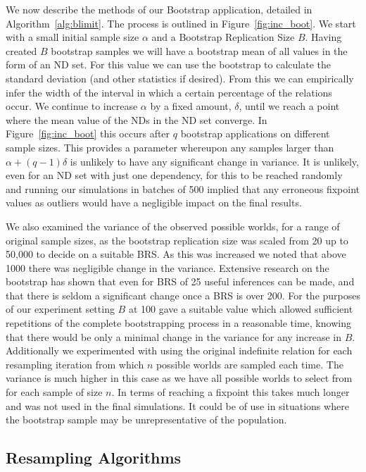 We now describe the methods of our Bootstrap application, detailed in
Algorithm~\ref{alg:blimit}. The process is outlined in
Figure~\ref{fig:inc_boot}.
We start with a small initial sample size $\alpha$ and a 
Bootstrap Replication Size $B$. 
Having created $B$ bootstrap samples we will have a bootstrap
mean of all values in the form of an ND set. For this value
we can use the bootstrap to calculate the standard deviation
(and other statistics if desired). From this we can empirically infer
the width of the interval 
in which a certain percentage of the relations occur. We continue
to increase $\alpha$ by a fixed amount, $\delta$, until we reach 
a point where
the mean value of the NDs in the ND set converge. In
Figure~\ref{fig:inc_boot} this occurs after $q$ bootstrap applications
on different sample sizes. This 
provides a parameter whereupon any samples larger than $\alpha + (q-1)
\delta$ is unlikely to have 
any significant change in variance. It is unlikely, even for an ND set with
just one dependency, for this to be reached randomly and running
our simulations in batches of 500 implied that any erroneous fixpoint
values as outliers would have a negligible impact on the final results.

\medskip

We also examined the variance of the
observed possible worlds, for a range of original sample sizes,
 as the bootstrap replication
size was scaled from 20 up to 50,000 to decide on a suitable BRS. 
As this was increased we noted that
above 1000 there was negligible change in the variance. Extensive research
on the bootstrap has shown that even for BRS of 25 useful inferences
can be made, and that there is seldom a significant change once a BRS
is over 200.
For the purposes
of our experiment setting $B$ at 100 gave a suitable value
which allowed sufficient repetitions of the complete bootstrapping process
in a reasonable time, knowing that there would be only a minimal change
in the variance for any increase in $B$. Additionally we experimented with 
using the original indefinite 
relation for each resampling iteration from which $n$ possible worlds are
sampled each time. The variance is much higher in this case as we
have all possible worlds to select from for each sample of size $n$.
In terms of reaching a fixpoint this takes much longer and was not used
in the final simulations. It could be of use
in situations where the
bootstrap sample may be unrepresentative of the population.


\subsection{Resampling Algorithms}\label{sec:cp_resalg}

